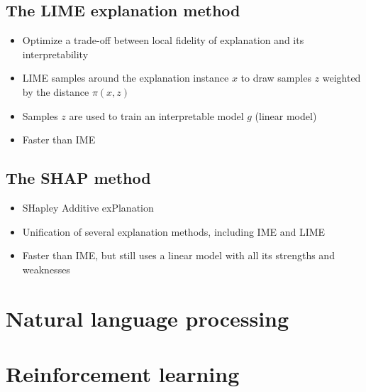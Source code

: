\documentclass{article}
\begin{document}
    \subsection{The LIME explanation method}
    \begin{itemize}
        \item Optimize a trade-off between local fidelity of explanation and its interpretability
        \item LIME samples around the explanation instance $x$ to draw samples $z$ weighted by the distance $\pi(x, z)$
        \item Samples $z$ are used to train an interpretable model $g$ (linear model)
        \item Faster than IME
    \end{itemize}

    \subsection{The SHAP method}
    \begin{itemize}
        \item SHapley Additive exPlanation
        \item Unification of several explanation methods, including IME and LIME
        \item Faster than IME, but still uses a linear model with all its strengths and weaknesses
    \end{itemize}

    \newpage

\section{Natural language processing}
    \newpage

\section{Reinforcement learning}
    \newpage
\end{document}
